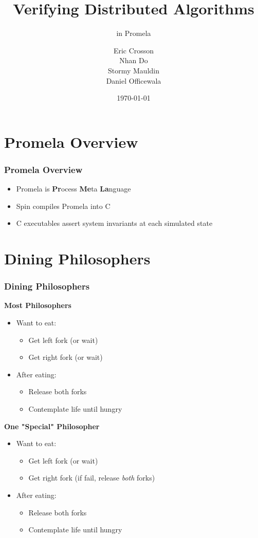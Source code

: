 \documentclass[t, pdftex]{beamer}
\title{Verifying Distributed Algorithms}
\subtitle{in Promela}
\author{Eric Crosson \\ Nhan Do \\ Stormy Mauldin \\ Daniel Officewala}
\institute{EE 360P}
\date{\today}
\begin{document}
\titleframe



\section{Promela Overview}
\begin{frame}
    \frametitle{Promela Overview}
    \begin{itemize}
      \item Promela is \textbf{Pr}ocess \textbf{Me}ta \textbf{La}nguage
      \item Spin compiles Promela into C
      \item C executables assert system invariants at each simulated state
    \end{itemize}
\end{frame}

\section{Dining Philosophers}
\begin{frame}[c]
  \frametitle{Dining Philosophers}
  \begin{multicols}{2}
    \textbf{Most Philosophers}
    \begin{itemize}
      \item Want to eat:
      \begin{itemize}
        \item Get left fork (or wait)
        \item Get right fork (or wait)
      \end{itemize}
      \item After eating:
      \begin{itemize}
        \item Release both forks
        \item Contemplate life until hungry
      \end{itemize}
    \end{itemize}
    \columnbreak
    \textbf{One "Special" Philosopher}
    \begin{itemize}
      \item Want to eat:
      \begin{itemize}
        \item Get left fork (or wait)
        \item Get right fork (if fail, release \textit{both} forks)
      \end{itemize}
      \item After eating:
      \begin{itemize}
        \item Release both forks
        \item Contemplate life until hungry
      \end{itemize}
    \end{itemize}
  \end{multicols}
\end{frame}
\end{document}

